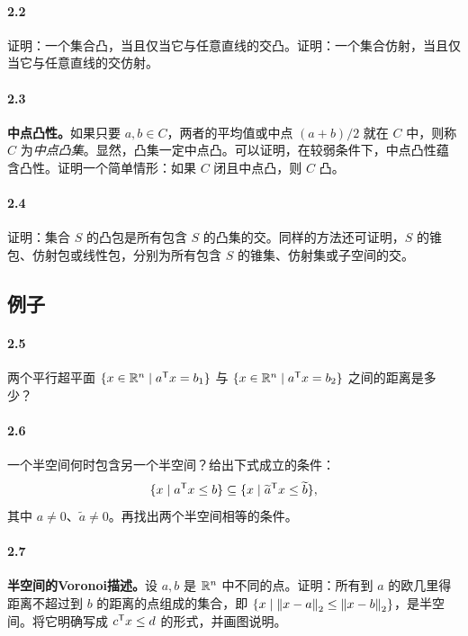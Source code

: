 \paragraph{2.2}
证明：一个集合凸，当且仅当它与任意直线的交凸。证明：一个集合仿射，当且仅当它与任意直线的交仿射。

\paragraph{2.3}
\textbf{中点凸性。}如果只要 $a,b\in C$，两者的平均值或中点 $(a+b)/2$ 就在 $C$ 中，则称 $C$ 为\emph{中点凸集}。显然，凸集一定中点凸。可以证明，在较弱条件下，中点凸性蕴含凸性。证明一个简单情形：如果 $C$ 闭且中点凸，则 $C$ 凸。

\paragraph{2.4}
证明：集合 $S$ 的凸包是所有包含 $S$ 的凸集的交。同样的方法还可证明，$S$ 的锥包、仿射包或线性包，分别为所有包含 $S$ 的锥集、仿射集或子空间的交。

\subsection*{例子}
\paragraph{2.5}
两个平行超平面 $\{x\in\mathbb R^n\mid a^{\mathsf T}x=b_1\}$ 与 $\{x\in\mathbb R^n\mid a^{\mathsf T}x=b_2\}$ 之间的距离是多少？

\paragraph{2.6}
一个半空间何时包含另一个半空间？给出下式成立的条件：
\[
 \{x\mid a^{\mathsf T}x\le b\}\subseteq
 \{x\mid\widetilde a^{\mathsf T}x\le\widetilde b\},
\]
其中 $a\ne0$、$\widetilde a\ne0$。再找出两个半空间相等的条件。

\paragraph{2.7}
\textbf{半空间的Voronoi描述。}设 $a,b$ 是 $\mathbb R^n$ 中不同的点。证明：所有到 $a$ 的欧几里得距离不超过到 $b$ 的距离的点组成的集合，即
$\{x\mid\left\lVert x-a\right\rVert_2\le\left\lVert x-b\right\rVert_2\}$，是半空间。将它明确写成 $c^{\mathsf T}x\le d$ 的形式，并画图说明。

